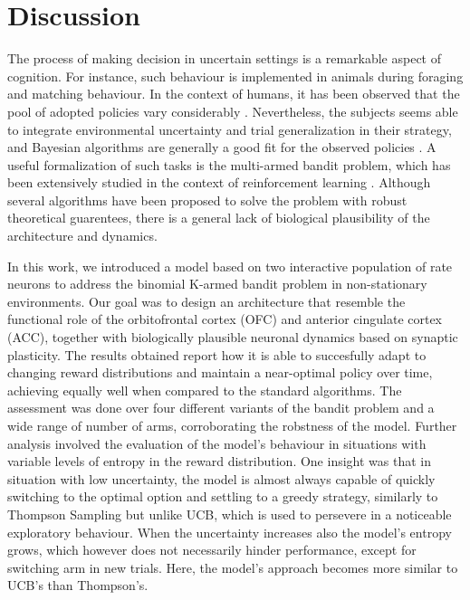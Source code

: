 
\section{Discussion}

The process of making decision in uncertain settings is a remarkable aspect of cognition. For instance, such behaviour is implemented in animals during foraging and matching behaviour.
In the context of humans, it has been observed that the pool of adopted policies vary considerably \cite{steyversBayesianAnalysisHuman2009a}.
Nevertheless, the subjects seems able to integrate environmental uncertainty and trial generalization in their strategy, and Bayesian algorithms are generally a good fit for the observed policies \cite{schulzFindingStructureMultiarmed2020, zhangForgetfulBayesMyopic2013}.
A useful formalization of such tasks is the multi-armed bandit problem, which has been extensively studied in the context of reinforcement learning \cite{suttonReinforcementLearningProblem1998}.
Although several algorithms have been proposed to solve the problem with robust theoretical guarentees, there is a general lack of biological plausibility of the architecture and dynamics.

%
In this work, we introduced a model based on two interactive population of rate neurons to address the binomial K-armed bandit problem in non-stationary environments.
Our goal was to design an architecture that resemble the functional role of the orbitofrontal cortex (OFC) and anterior cingulate cortex (ACC), together with biologically plausible neuronal dynamics based on synaptic plasticity.
The results obtained report how it is able to succesfully adapt to changing reward distributions and maintain a near-optimal policy over time, achieving equally well when compared to the standard algorithms.
The assessment was done over four different variants of the bandit problem and a wide range of number of arms, corroborating the robstness of the model.
Further analysis involved the evaluation of the model's behaviour in situations with variable levels of entropy in the reward distribution.
One insight was that in situation with low uncertainty, the model is almost always capable of quickly switching to the optimal option and settling to a greedy strategy, similarly to Thompson Sampling but unlike UCB, which is used to persevere in a noticeable exploratory behaviour.
When the uncertainty increases also the model's entropy grows, which however does not necessarily hinder performance, except for switching arm in new trials. Here, the model's approach becomes more similar to UCB's than Thompson's.

